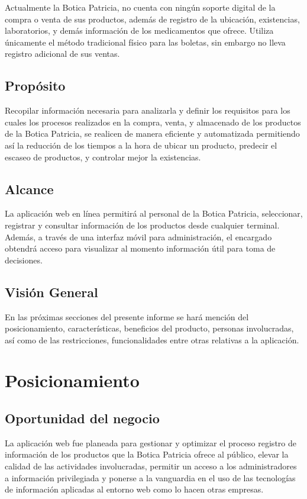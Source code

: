 \documentclass[a4paper,11pt, spanish]{report}
\begin{document}
Actualmente la Botica Patricia, no cuenta con ningún soporte digital de la compra o venta de sus productos, además de registro de la ubicación, existencias, laboratorios, y demás información de los medicamentos que ofrece. Utiliza únicamente el método tradicional físico para las boletas, sin embargo no lleva registro adicional de sus ventas.

      \subsection{Propósito}
      Recopilar información necesaria para analizarla y definir los requisitos para los cuales los procesos realizados en la compra, venta, y almacenado de los productos de la Botica Patricia, se realicen de manera eficiente y automatizada permitiendo así la reducción de los tiempos a la hora de ubicar un producto, predecir el escaseo de productos, y controlar mejor la existencias.

      \subsection{Alcance}
      La aplicación web en línea permitirá al personal de la Botica Patricia,  seleccionar, registrar y consultar información de los productos desde cualquier terminal. Además, a través de una interfaz móvil para administración, el encargado obtendrá acceso para visualizar al momento información útil para toma de decisiones.

      \subsection{Visión General}
      En las próximas secciones del presente informe se hará mención del posicionamiento, características, beneficios del producto,	personas	involucradas,	así	como	de	las restricciones, funcionalidades entre otras relativas a la aplicación.

    \section{Posicionamiento}
      \subsection{Oportunidad del negocio}
      La aplicación web fue planeada para gestionar y optimizar el proceso registro de información de los productos que la Botica Patricia ofrece al público, elevar la calidad de las actividades involucradas, permitir un acceso a los administradores a información privilegiada y ponerse a la vanguardia en el uso de las tecnologías de información aplicadas al entorno web como lo hacen otras empresas.
\end{document}
